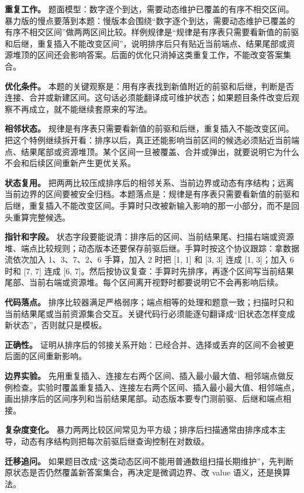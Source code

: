 \textbf{重复工作。} 题面模型：数字逐个到达，需要动态维护已覆盖的有序不相交区间。暴力版的慢点要落到本题：慢版本会围绕“数字逐个到达，需要动态维护已覆盖的有序不相交区间”做两两区间比较。样例规律是“规律是有序表只需要看新值的前驱和后继，重复插入不能改变区间”，说明排序后只有贴近当前端点、结果尾部或资源堆顶的区间还会影响答案。后面的优化只消掉这类重复工作，不能改变答案集合。

\textbf{优化条件。} 本题的关键观察是：用有序表找到新值附近的前驱和后继，判断是否连接、合并或新建区间。这句话必须能翻译成可维护状态；如果题目条件改变后观察不再成立，就不能继续套原来的写法。

\textbf{相邻状态。} 规律是有序表只需要看新值的前驱和后继，重复插入不能改变区间。把这个特例继续拆开看：排序以后，真正还能影响当前区间的候选必须贴近当前端点、结果尾部或资源堆顶。某个区间一旦被覆盖、合并或弹出，就要说明它为什么不会和后续区间重新产生更优关系。

\textbf{状态复用。} 把两两比较压成排序后的相邻关系、当前边界或动态有序结构；远离当前边界的区间要被安全归档。本题落点是：规律是有序表只需要看新值的前驱和后继，重复插入不能改变区间。手算时只改被新输入影响的那一小部分，而不是回头重算完整候选。

\textbf{指针和字段。} 状态字段要能说清：排序后的区间、当前结果尾、扫描右端或资源堆、端点比较规则；动态版本还要保存前驱后继。手算时按这个协议跟踪：拿数据流依次加入 1、3、7、2、6 手算，加入 2 时把 [1, 1] 和 [3, 3] 连成 [1, 3]；加入 6 时和 [7, 7] 连成 [6, 7]。然后按协议复查：手算时先排序，再逐个区间写当前结果尾部、当前右端或资源堆。每个区间离开视野时都要说明它不会再影响后续。

\textbf{代码落点。} 排序比较器满足严格弱序；端点相等的处理和题意一致；扫描时只和当前结果尾或当前资源集合交互。关键代码行必须能逐句翻译成“旧状态怎样变成新状态”，否则就只是模板。

\textbf{正确性。} 证明从排序后的邻接关系开始：已经合并、选择或丢弃的区间不会被更后面的区间重新影响。

\textbf{边界实验。} 先用重复插入、连接左右两个区间、插入最小最大值、相邻端点做反例检查。实验时覆盖重复插入、连接左右两个区间、插入最小最大值、相邻端点，画出排序后的区间序列和当前结果尾部。动态版本要专门测前驱、后继和端点相接。

\textbf{复杂度变化。} 暴力两两比较区间常见为平方级；排序后扫描通常由排序成本主导，动态有序结构则把每次前驱后继查询控制在对数级。

\textbf{迁移追问。} 如果题目改成“这类动态区间不能用普通数组扫描长期维护”，先判断原状态是否仍然覆盖新答案集合，再决定是微调边界、改 value 语义，还是换算法。

